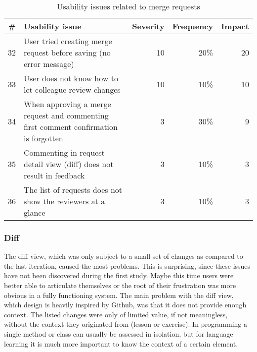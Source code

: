 \begin{table}[h!]
\centering
\begin{tabular}{|r|p{7cm}|r|r|r|}
\hline
\rowcolor[HTML]{EFEFEF}
{\bf \#} & {\bf Usability issue} & {\bf Severity} & {\bf Frequency} & {\bf Impact} \\ \hline
32 & User tried creating merge request before saving (no error message) & 10 & 20\% & 20 \\ \hline
33 & User does not know how to let colleague review changes & 10 & 10\% & 10 \\ \hline
34 & When approving a merge request and commenting first comment confirmation is forgotten & 3 & 30\% & 9 \\ \hline
35 & Commenting in request detail view (diff) does not result in feedback & 3 & 10\% & 3 \\ \hline
36 & The list of requests does not show the reviewers at a glance & 3 & 10\% & 3 \\ \hline
\end{tabular}
\caption{Usability issues related to merge requests}
\label{table:issues-merge}
\end{table}

\subsubsection{Diff}
The diff view, which was only subject to a small set of changes as compared to the last iteration, caused the most problems. This is surprising, since these issues have not been discovered during the first study. Maybe this time users were better able to articulate themselves or the root of their frustration was more obvious in a fully functioning system. The main problem with the diff view, which design is heavily inspired by Github, was that it does not provide enough context. The listed changes were only of limited value, if not meaningless, without the context they originated from (lesson or exercise). In programming a single method or class can usually be assessed in isolation, but for language learning it is much more important to know the context of a certain element.



